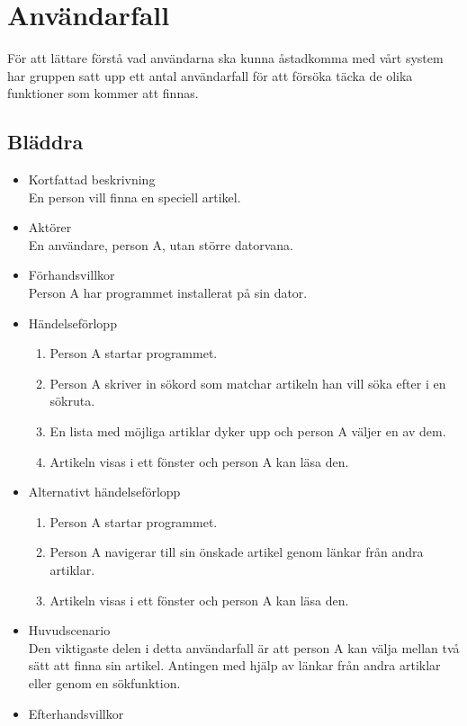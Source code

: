 \section{Användarfall} 

För att lättare förstå vad användarna ska kunna åstadkomma med vårt system har gruppen satt upp ett antal användarfall för att försöka täcka de olika funktioner som kommer att finnas.

\subsection{Bläddra}

\begin{itemize}
	\item Kortfattad beskrivning
	\\En person vill finna en speciell artikel.
	\item Aktörer
	\\En användare, person A, utan större datorvana.
	\item Förhandsvillkor
	\\Person A har programmet installerat på sin dator.
	\item Händelseförlopp
	\begin{enumerate}
		\item Person A startar programmet.
		\item Person A skriver in sökord som matchar artikeln han vill söka efter i en sökruta.
		\item En lista med möjliga artiklar dyker upp och person A väljer en av dem.
		\item Artikeln visas i ett fönster och person A kan läsa den.
	\end{enumerate}
	\item Alternativt händelseförlopp
	\begin{enumerate}
		\item Person A startar programmet.
		\item Person A navigerar till sin önskade artikel genom länkar från andra artiklar.	
		\item Artikeln visas i ett fönster och person A kan läsa den.
	\end{enumerate}	
	\item Huvudscenario
	\\Den viktigaste delen i detta användarfall är att person A kan välja mellan två sätt att finna sin artikel. Antingen med hjälp av länkar från andra artiklar eller genom en sökfunktion.
	\item Efterhandsvillkor

\end{itemize}
